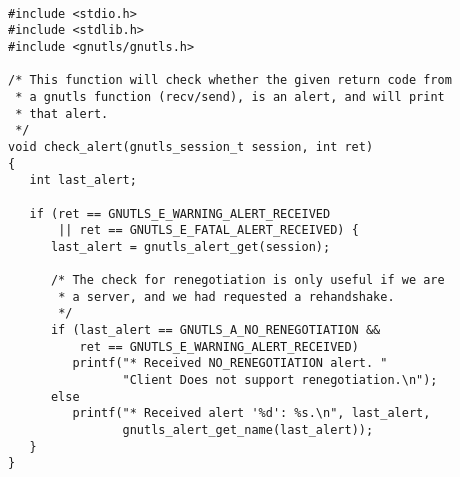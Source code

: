 \begin{verbatim}

#include <stdio.h>
#include <stdlib.h>
#include <gnutls/gnutls.h>

/* This function will check whether the given return code from
 * a gnutls function (recv/send), is an alert, and will print
 * that alert.
 */
void check_alert(gnutls_session_t session, int ret)
{
   int last_alert;

   if (ret == GNUTLS_E_WARNING_ALERT_RECEIVED
       || ret == GNUTLS_E_FATAL_ALERT_RECEIVED) {
      last_alert = gnutls_alert_get(session);

      /* The check for renegotiation is only useful if we are 
       * a server, and we had requested a rehandshake.
       */
      if (last_alert == GNUTLS_A_NO_RENEGOTIATION &&
          ret == GNUTLS_E_WARNING_ALERT_RECEIVED)
         printf("* Received NO_RENEGOTIATION alert. "
                "Client Does not support renegotiation.\n");
      else
         printf("* Received alert '%d': %s.\n", last_alert,
                gnutls_alert_get_name(last_alert));
   }
}

\end{verbatim}
